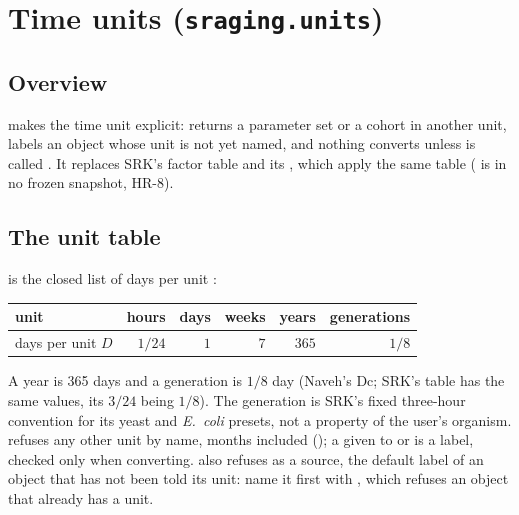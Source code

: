 \section{Time units (\texttt{sraging.units})}\label{sec:units}

\subsection{Overview}\label{sec:units-overview}

 makes the time unit explicit:  returns a parameter set or a cohort in another unit,
 labels an object whose unit is not yet named, and nothing converts unless  is called
. It replaces SRK's  factor table and its
, which apply the same table ( is in no frozen snapshot, HR-8).

\subsection{The unit table}\label{sec:units-table}

 is the closed list of days per unit :
\begin{center}\begin{tabular}{lrrrrr}
\toprule
unit & hours & days & weeks & years & generations\\
\midrule
days per unit $D$ & $1/24$ & $1$ & $7$ & $365$ & $1/8$\\
\bottomrule
\end{tabular}\end{center}
A year is 365 days and a generation is $1/8$ day (Naveh's Dc; SRK's table has the same values, its $3/24$ being
$1/8$). The generation is SRK's fixed three-hour convention for its yeast and \textit{E.~coli} presets, not a property
of the user's organism.  refuses any other unit by name, months included ();
a  given to  or  is a label, checked only when
converting.  also refuses
 as a source, the default label of an object that has not been told its unit: name it
first with , which refuses an object that already has a unit.


